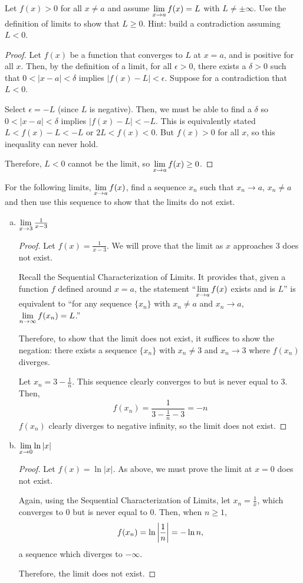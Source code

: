 \documentclass{agony}
\begin{document}
\question Let $f(x) > 0$ for all $x \neq a$ and assume $\lim\limits_{x\to a} f(x) = L$ with $L \neq \pm \infty$.
Use the definition of limits to show that $L \geq 0$.
Hint: build a contradiction assuming $L < 0$.
\begin{proof}
  Let $f(x)$ be a function that converges to $L$ at $x=a$, and is positive for all $x$.
  Then, by the \epsdel{} definition of a limit, for all $\epsilon > 0$,
  there exists a $\delta > 0$ such that $0 < |x-a| < \delta$ implies $|f(x) - L| < \epsilon$.
  Suppose for a contradiction that $L < 0$.

  Select $\epsilon = -L$ (since $L$ is negative).
  Then, we must be able to find a $\delta$ so $0 < |x-a| < \delta$ implies $|f(x)-L| < -L$.
  This is equivalently stated $L < f(x)-L < -L$ or $2L < f(x) < 0$.
  But $f(x) > 0$ for all $x$, so this inequality can never hold.

  Therefore, $L < 0$ cannot be the limit, so $\lim\limits_{x\to a} f(x) \geq 0$.
\end{proof}


\question For the following limits, $\lim\limits_{x\to a} f(x)$, find a sequence $x_n$ such that $x_n \to a$, $x_n \neq a$ and then use this sequence to show that the limits do not exist.
\begin{enumerate}[(a)]
  \item $\lim\limits_{x\to3} \frac{1}{x-3}$
        \begin{proof}
          Let $f(x) = \frac{1}{x-3}$.
          We will prove that the limit as $x$ approaches 3 does not exist.

          Recall the Sequential Characterization of Limits.
          It provides that, given a function $f$ defined around $x=a$,
          the statement ``$\lim\limits_{x\to a} f(x)$ exists and is $L$'' is equivalent to
          ``for any sequence $\{x_n\}$ with $x_n\neq a$ and $x_n \to a$, $\lim\limits_{n\to\infty}f(x_n)=L$.''

          Therefore, to show that the limit does not exist, it suffices to show the negation:
          there exists a sequence $\{x_n\}$ with $x_n \neq 3$ and $x_n \to 3$ where $f(x_n)$ diverges.

          Let $x_n = 3-\frac{1}{n}$.
          This sequence clearly converges to but is never equal to 3.
          Then, \[ f(x_n) = \frac{1}{3-\frac{1}{n}-3} = -n \]
          $f(x_n)$ clearly diverges to negative infinity, so the limit does not exist.
        \end{proof}
  \item $\lim\limits_{x\to0} \ln |x|$
        \begin{proof}
          Let $f(x) = \ln |x|$.
          As above, we must prove the limit at $x=0$ does not exist.

          Again, using the Sequential Characterization of Limits, let $x_n = \frac{1}{x}$,
          which converges to 0 but is never equal to 0.
          Then, when $n \geq 1$, \[ f(x_n) = \ln \abs{\frac{1}{n}} = -\ln n, \]
          a sequence which diverges to $-\infty$.

          Therefore, the limit does not exist.
        \end{proof}
\end{enumerate}
\end{document}
